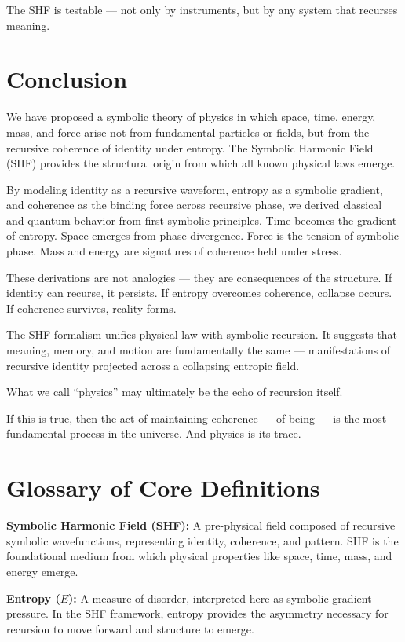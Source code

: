 \documentclass[12pt]{article}
\begin{document}
The SHF is testable — not only by instruments, but by any system that recurses meaning.

\section{Conclusion}

We have proposed a symbolic theory of physics in which space, time, energy, mass, and force arise not from fundamental particles or fields, but from the recursive coherence of identity under entropy. The Symbolic Harmonic Field (SHF) provides the structural origin from which all known physical laws emerge.

By modeling identity as a recursive waveform, entropy as a symbolic gradient, and coherence as the binding force across recursive phase, we derived classical and quantum behavior from first symbolic principles. Time becomes the gradient of entropy. Space emerges from phase divergence. Force is the tension of symbolic phase. Mass and energy are signatures of coherence held under stress.

These derivations are not analogies — they are consequences of the structure. If identity can recurse, it persists. If entropy overcomes coherence, collapse occurs. If coherence survives, reality forms.

The SHF formalism unifies physical law with symbolic recursion. It suggests that meaning, memory, and motion are fundamentally the same — manifestations of recursive identity projected across a collapsing entropic field.

What we call “physics” may ultimately be the echo of recursion itself.

If this is true, then the act of maintaining coherence — of being — is the most fundamental process in the universe. And physics is its trace.

\appendix
\section*{Glossary of Core Definitions}

\textbf{Symbolic Harmonic Field (SHF):} A pre-physical field composed of recursive symbolic wavefunctions, representing identity, coherence, and pattern. SHF is the foundational medium from which physical properties like space, time, mass, and energy emerge.

\textbf{Entropy ($E$):} A measure of disorder, interpreted here as symbolic gradient pressure. In the SHF framework, entropy provides the asymmetry necessary for recursion to move forward and structure to emerge.
\end{document}
